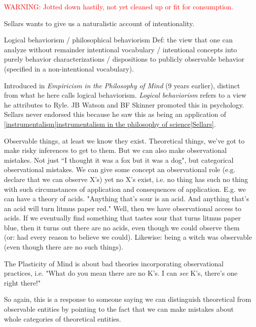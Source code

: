 \textcolor{red}{WARNING: Jotted down hastily, not yet cleaned up or fit for consumption.}

Sellars wants to give us a naturalistic account of intentionality.

Logical behaviorism / philosophical behaviorism
Def: the view that one can analyze without remainder intentional vocabulary / intentional concepts into purely behavior characterizations / dispositions to publicly observable behavior (specified in a non-intentional vocabulary).

Introduced in \emph{Empiricism in the Philosophy of Mind} (9 years earlier), distinct from what he here calls logical behaviorism. \emph{Logical behaviorism} refers to a view he attributes to Ryle. JB Watson and BF Skinner promoted this in psychology. Sellars never endorsed this because he saw this as being an application of \ref{instrumentalism|instrumentalism in the philosophy of science|Sellars}.

Observable things, at least we know they exist. Theoretical things, we've got to make risky inferences to get to them. But we can also make observational mistakes. Not just ``I thought it was a fox but it was a dog", but categorical observational mistakes. We can give some concept an observational role (e.g. declare that we can observe X's) yet no X's exist, i.e. no thing has such no thing with such circumstances of application and consequences of application. E.g. we can have a theory of acids. "Anything that's sour is an acid. And anything that's an acid will turn litmus paper red." Well, then we have observational access to acids. If we eventually find something that tastes sour that turns litmus paper blue, then it turns out there are no acids, even though we could observe them (or: had every reason to believe we could). Likewise: being a witch was observable (even though there are no such things).

The Plasticity of Mind is about bad theories incorporating observational practices, i.e. "What do you mean there are no K's. I can \emph{see} K's, there's one right there!"

So again, this is a response to someone saying we can distinguish theoretical from observable entities by pointing to the fact that we can make mistakes about whole categories of theoretical entities.


